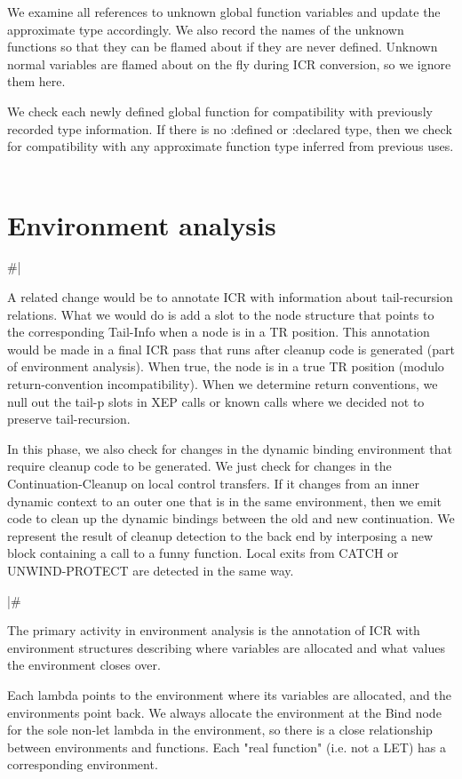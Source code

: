 We examine all references to unknown global function variables and update the
approximate type accordingly.  We also record the names of the unknown
functions so that they can be flamed about if they are never defined.  Unknown
normal variables are flamed about on the fly during ICR conversion, so we
ignore them here.

We check each newly defined global function for compatibility with previously
recorded type information.  If there is no :defined or :declared type, then we
check for compatibility with any approximate function type inferred from
previous uses.
	
\chapter{Environment analysis}
\#|

A related change would be to annotate ICR with information about tail-recursion
relations.  What we would do is add a slot to the node structure that points to
the corresponding Tail-Info when a node is in a TR position.  This annotation
would be made in a final ICR pass that runs after cleanup code is generated
(part of environment analysis).  When true, the node is in a true TR position
(modulo return-convention incompatibility).  When we determine return
conventions, we null out the tail-p slots in XEP calls or known calls where we
decided not to preserve tail-recursion. 


In this phase, we also check for changes in the dynamic binding environment
that require cleanup code to be generated.  We just check for changes in the
Continuation-Cleanup on local control transfers.  If it changes from
an inner dynamic context to an outer one that is in the same environment, then
we emit code to clean up the dynamic bindings between the old and new
continuation.  We represent the result of cleanup detection to the back end by
interposing a new block containing a call to a funny function.  Local exits
from CATCH or UNWIND-PROTECT are detected in the same way.


|\#

The primary activity in environment analysis is the annotation of ICR with
environment structures describing where variables are allocated and what values
the environment closes over.

Each lambda points to the environment where its variables are allocated, and
the environments point back.  We always allocate the environment at the Bind
node for the sole non-let lambda in the environment, so there is a close
relationship between environments and functions.  Each "real function" (i.e.
not a LET) has a corresponding environment.

